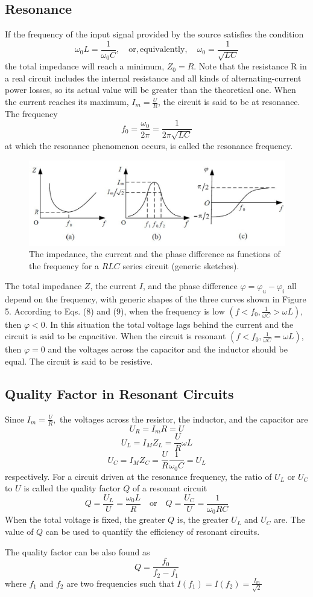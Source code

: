 \documentclass[12pt]{article}
\begin{document}
\subsection{Resonance}
If the frequency of the input signal provided by the source satisfies the condition
$$\omega_0L=\frac{1}{\omega_0C},\quad\mathrm{or,equivalently,}\quad\omega_0=\frac{1}{\sqrt{LC}}$$
the total impedance will reach a minimum, $Z_0=R$. Note that the resistance R in a real
circuit includes the internal resistance and all kinds of alternating-current power losses,
so its actual value will be greater than the theoretical one.
When the current reaches its maximum, $I_m=\frac{U}{R}$, the circuit is said to be at resonance. The frequency
$$f_0=\frac{\omega_0}{2\pi}=\frac{1}{2\pi\sqrt{LC}}$$
at which the resonance phenomenon occurs, is called the resonance frequency.
\begin{figure}[H]
\centering
\includegraphics[scale=0.4]{P5.jpg}
\caption{The impedance, the current and the phase difference as functions of the frequency for a $RLC$ series circuit (generic sketches).}
\end{figure}
\par The total impedance $Z$, the current $I$, and the phase difference $\varphi=\varphi_u-\varphi_i$ all depend
on the frequency, with generic shapes of the three curves shown in Figure 5. According
to Eqs. (8) and (9), when the frequency is low $(f<f_0,\frac{1}{\omega C}>\omega L)$, then $\varphi<0$.
In this situation the total voltage lags behind the current and the circuit is said to be capacitive.
When the circuit is resonant $(f<f_0,\frac{1}{\omega C}=\omega L)$, then $\varphi=0$ and the voltages
across the capacitor and the inductor should be equal. The circuit is said to be resistive.
\subsection{Quality Factor in Resonant Circuits}
Since $I_m=\frac{U}{R},$ the voltages across the resistor, the inductor, and the capacitor are
$$U_R=I_m R=U$$
$$U_L=I_M Z_L=\frac{U}{R}\omega L$$
$$U_C=I_M Z_C=\frac{U}{R}\frac{1}{\omega_0 C}=U_L$$
respectively. For a circuit driven at the resonance frequency, the ratio of $U_L$ or $U_C$ to $U$ is called the quality factor $Q$ of a resonant circuit
$$Q=\frac{U_L}{U}=\frac{\omega_0 L}{R}\quad\mathrm{or}\quad Q=\frac{U_C}{U}=\frac{1}{\omega_0 RC}$$
When the total voltage is fixed, the greater $Q$ is, the greater $U_L$ and $U_C$ are. The value
of $Q$ can be used to quantify the efficiency of resonant circuits.
\par The quality factor can be also found as 
$$Q=\frac{f_0}{f_2-f_1}$$
where $f_1$ and $f_2$ are two frequencies such that $I(f_1)=I(f_2)=\frac{I_m}{\sqrt{2}}$
\end{document}
